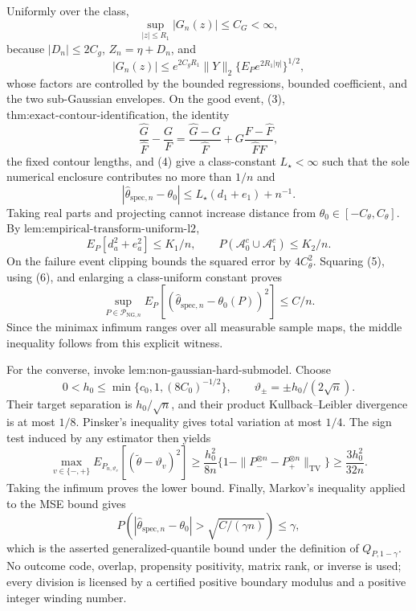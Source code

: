 Uniformly over the class,
\[
 \sup_{|z|\le R_1}|G_n(z)|\le C_G<\infty, \tag{4}
\]
because \(|D_n|\le2C_g\), \(Z_n=\eta+D_n\), and
\[
 |G_n(z)|
 \le e^{2C_gR_1}\|Y\|_2
      \{E_Pe^{2R_1|\eta|}\}^{1/2},
\]
whose factors are controlled by the bounded regressions, bounded coefficient, and the two sub-Gaussian envelopes.  On the good event, (3), \(\text{thm:exact-contour-identification}\), the identity
\[
 \frac{\widehat G}{\widehat F}-\frac G F
 =\frac{\widehat G-G}{\widehat F}
   +G\frac{F-\widehat F}{{\widehat F}F},
\]
the fixed contour lengths, and (4) give a class-constant \(L_{\star}<\infty\) such that the sole numerical enclosure contributes no more than \(1/n\) and
\[
 |\widehat\theta_{\mathrm{spec},n}-\theta_0|
 \le L_{\star}(d_1+e_1)+n^{-1}. \tag{5}
\]
Taking real parts and projecting cannot increase distance from \(\theta_0\in[-C_{\theta},C_{\theta}]\).  By \(\text{lem:empirical-transform-uniform-l2}\),
\[
 E_P[d_a^2+e_a^2]\le K_1/n,
 \qquad
 P(\mathcal A_0^c\cup\mathcal A_1^c)\le K_2/n. \tag{6}
\]
On the failure event clipping bounds the squared error by \(4C_{\theta}^2\).  Squaring (5), using (6), and enlarging a class-uniform constant proves
\[
 \sup_{P\in\mathcal P_{\mathrm{NG},n}}
 E_P[(\widehat\theta_{\mathrm{spec},n}-\theta_0(P))^2]
 \le C/n.
\]
Since the minimax infimum ranges over all measurable sample maps, the middle inequality follows from this explicit witness.

For the converse, invoke \(\text{lem:non-gaussian-hard-submodel}\).  Choose
\[
 0<h_0\le\min\{c_0,1,(8C_0)^{-1/2}\},
 \qquad \vartheta_{\pm}=\pm h_0/(2\sqrt n).
\]
Their target separation is \(h_0/\sqrt n\), and their product Kullback--Leibler divergence is at most \(1/8\).  Pinsker's inequality gives total variation at most \(1/4\).  The sign test induced by any estimator then yields
\[
 \max_{v\in\{-,+\}}
 E_{P_{n,\vartheta_v}}[(\widetilde\theta-\vartheta_v)^2]
 \ge\frac{h_0^2}{8n}
 \{1-\|P_-^{\otimes n}-P_+^{\otimes n}\|_{\mathrm{TV}}\}
 \ge\frac{3h_0^2}{32n}.
\]
Taking the infimum proves the lower bound.  Finally, Markov's inequality applied to the MSE bound gives
\[
 P\left(|\widehat\theta_{\mathrm{spec},n}-\theta_0|>\sqrt{C/(\gamma n)}\right)
 \le\gamma,
\]
which is the asserted generalized-quantile bound under the definition of \(Q_{P,1-\gamma}\).  No outcome code, overlap, propensity positivity, matrix rank, or inverse is used; every division is licensed by a certified positive boundary modulus and a positive integer winding number.